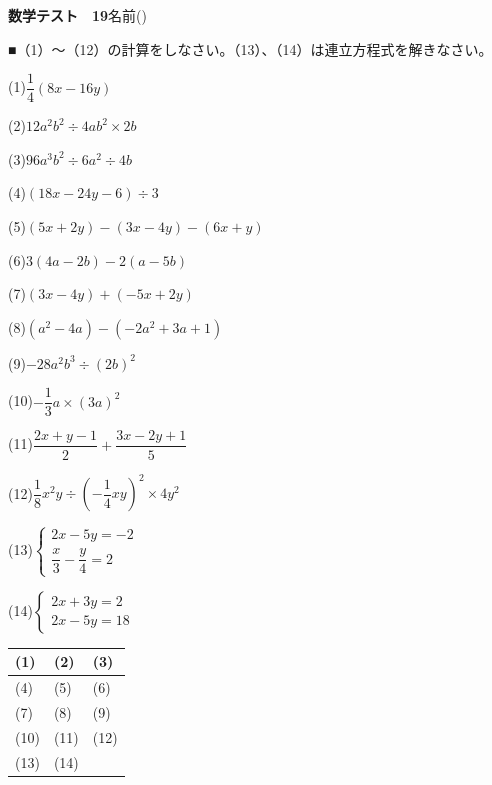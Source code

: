 \documentclass[a4paper,11pt]{ltjsarticle}
\newlength{\qcol}\setlength{\qcol}{0.47\textwidth}
\newlength{\qgap}
\newlength{\anscolw}\setlength{\anscolw}{0.30\textwidth}
\newlength{\ansh}
\newcommand{\Q}[2]{\parbox[t]{\qcol}{\raggedright (#1)\hspace{0.6em}$\displaystyle #2$}}
\newcommand{\QR}[4]{\Q{#1}{#2}\hfill\Q{#3}{#4}\par\vspace{\qgap}}
\newcommand{\anscell}[1]{\rule[-\ansdrop]{0pt}{\ansh}(#1)}
\newlength{\ansdrop}
\begin{document}
{\large\bfseries 数学テスト　19}\hfill 名前(\underline{\hspace{32mm}})\par\vspace{3mm}
■（1）〜（12）の計算をしなさい。（13）、（14）は連立方程式を解きなさい。\par\vspace{3mm}
\setlength{\qgap}{11mm}
\QR{1}{\dfrac{1}{4}(8x-16y)}{2}{12a^2b^2\div4ab^2\times2b}
\QR{3}{96a^3b^2\div6a^2\div4b}{4}{(18x-24y-6)\div3}
\QR{5}{(5x+2y)-(3x-4y)-(6x+y)}{6}{3(4a-2b)-2(a-5b)}
\QR{7}{(3x-4y)+(-5x+2y)}{8}{(a^2-4a)-(-2a^2+3a+1)}
\QR{9}{-28a^2b^3\div(2b)^2}{10}{-\dfrac{1}{3}a\times(3a)^2}
\QR{11}{\dfrac{2x+y-1}{2}+\dfrac{3x-2y+1}{5}}{12}{\dfrac{1}{8}x^2y\div\left(-\dfrac{1}{4}xy\right)^2\times4y^2}
\QR{13}{\left\{\begin{array}{l} 2x-5y=-2 \\ \dfrac{x}{3}-\dfrac{y}{4}=2 \end{array}\right.}{14}{\left\{\begin{array}{l} 2x+3y=2 \\ 2x-5y=18 \end{array}\right.}
\vfill
\setlength{\ansh}{12mm}\setlength{\ansdrop}{8mm}%
\begin{center}\begin{tabular}{|p{\anscolw}|p{\anscolw}|p{\anscolw}|}\hline
\anscell{1} & \anscell{2} & \anscell{3} \\\hline
\anscell{4} & \anscell{5} & \anscell{6} \\\hline
\anscell{7} & \anscell{8} & \anscell{9} \\\hline
\anscell{10} & \anscell{11} & \anscell{12} \\\hline
\anscell{13} & \anscell{14} &  \\\hline
\end{tabular}\end{center}
\end{document}
